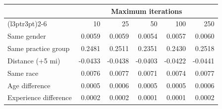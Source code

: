 
\begin{tabular}{lrrrrr}
\toprule
\multicolumn{1}{c}{ } & \multicolumn{5}{c}{Maximum iterations} \\
\cmidrule(l{3pt}r{3pt}){2-6}
 & 10 & 25 & 50 & 100 & 250\\
\midrule
\hspace{1em}Same gender & 0.0059 & 0.0059 & 0.0054 & 0.0057 & 0.0060\\
\hspace{1em}Same practice group & 0.2481 & 0.2511 & 0.2351 & 0.2430 & 0.2518\\
\hspace{1em}Distance (+5 mi) & -0.0433 & -0.0438 & -0.0403 & -0.0422 & -0.0441\\
\hspace{1em}Same race & 0.0076 & 0.0077 & 0.0071 & 0.0074 & 0.0077\\
\hspace{1em}Age difference & 0.0005 & 0.0006 & 0.0005 & 0.0005 & 0.0006\\
\hspace{1em}Experience difference & 0.0002 & 0.0002 & 0.0001 & 0.0001 & 0.0002\\
\bottomrule
\end{tabular}
